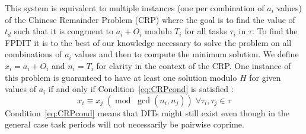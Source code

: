 \documentclass[conference]{IEEEtran}
\begin{document}
		This system is equivalent to multiple instances (one per combination of $a_i$
		values) of the Chinese Remainder Problem (CRP) where the goal is to find the
		value of $t_d$ such that it is congruent to $a_i+O_i$ modulo $T_i$ for all
		tasks $\tau_i$ in $\tau$. To find the FPDIT it is to the best of our knowledge
		necessary to solve the problem on all combinations of $a_i$ values and then
		to compute the minimum solution. We define $x_i = a_i+O_i$ and $n_i = T_i$ for
		clarity in the context of the CRP. One instance of this problem is guaranteed
		to have at least one solution modulo $H$ for given values of $a_i$ if and only if
		Condition~\ref{eq:CRPcond} is satisfied \cite{knuth1969art}:
		\begin{equation}
			\label{eq:CRPcond}
			x_i \equiv x_j \; (\operatorname{mod} \; \operatorname{gcd}(n_i, n_j))
			\; \forall \tau_i,\tau_j \in \tau
		\end{equation}
		Condition~\ref{eq:CRPcond} means that DITs might still exist even though in
		the general case task periods will not necessarily be pairwise coprime.
%
%
\end{document}
